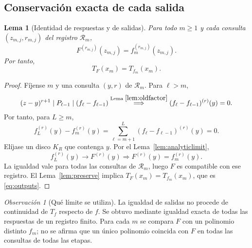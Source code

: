 \documentclass[11pt,a4paper]{article}
\numberwithin{equation}{section}
\newtheorem{lemma}[theorem]{Lema}
\theoremstyle{definition}
\theoremstyle{remark}
\newtheorem{remark}[theorem]{Observación}
\newcommand{\Rec}{\mathcal R}
\begin{document}
\subsection{Conservación exacta de cada salida}
\begin{lemma}[Identidad de respuestas y de salidas]\label{lem:limitrecords}
Para todo $m\ge1$ y cada consulta $(z_{m,j},r_{m,j})$ del registro $\Rec_m$,
\[
F^{(r_{m,j})}(z_{m,j})=f_m^{(r_{m,j})}(z_{m,j}).
\]
Por tanto,
\begin{equation}\label{eq:outputs}
T_F(x_m)=T_{f_m}(x_m).
\end{equation}
\end{lemma}
\begin{proof}
Fíjense $m$ y una consulta $(y,r)$ de $\Rec_m$. Para $\ell>m$,
\[
(z-y)^{r+1}\mid P_{\ell-1}\mid(f_\ell-f_{\ell-1})
\overset{\text{Lema }\ref{lem:oldfactor}}{\Longrightarrow}
(f_\ell-f_{\ell-1})^{(r)}(y)=0.
\]
Por tanto, para $L\ge m$,
\[
f_L^{(r)}(y)-f_m^{(r)}(y)
=\sum_{\ell=m+1}^L(f_\ell-f_{\ell-1})^{(r)}(y)=0.
\]
Elíjase un disco $K_R$ que contenga $y$. Por el Lema~\ref{lem:analyticlimit},
\[
f_L^{(r)}(y)\longrightarrow F^{(r)}(y)
\Longrightarrow F^{(r)}(y)=f_m^{(r)}(y).
\]
La igualdad vale para todas las consultas de $\Rec_m$, luego $F$ es compatible con ese registro. El Lema~\ref{lem:preserve} implica $T_F(x_m)=T_{f_m}(x_m)$, que es \eqref{eq:outputs}.
\end{proof}

\begin{remark}[Qué límite se utiliza]
La igualdad de salidas no procede de continuidad de $T_f$ respecto de $f$. Se obtuvo mediante igualdad exacta de todas las respuestas de un registro finito. Para cada $m$ se compara $F$ con un polinomio distinto $f_m$; no se afirma que un único polinomio coincida con $F$ en todas las consultas de todas las etapas.
\end{remark}
\end{document}

